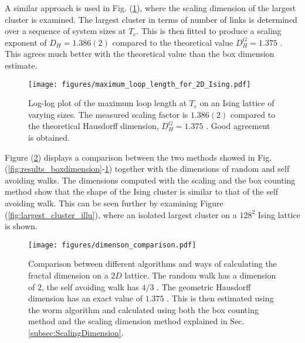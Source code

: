 \newpage

A similar approach is used in Fig. (\ref{fig:results_maxloopdimension}), where the scaling dimension of the largest cluster is examined. The largest cluster in terms of number of links is determined over a sequence of system sizes at $T_c$. This is then fitted to produce a scaling exponent of $D_H = 1.386(2)$ compared to the theoretical value $D_H^G = 1.375$ \cite{Duplantier:GeoHausdorff}. This agrees much better with the theoretical value than the box dimension estimate. 

\begin{figure}[h!]
    \centering
        \texttt{[image: figures/maximum\_loop\_length\_for\_2D\_Ising.pdf]}
    \caption{Log-log plot of the maximum loop length at $T_c$ on an Ising lattice of varying sizes. The measured scaling factor is $1.386(2)$ compared to the theoretical Hausdorff dimension, $D_H^G = 1.375$ \cite{Duplantier:GeoHausdorff}. Good agreement is obtained.}
    \label{fig:results_maxloopdimension}
\end{figure}



Figure (\ref{fig:comparsion_2d_lattice_dimensions}) displays a comparison between the two methods showed in Fig. (\ref{fig:results_boxdimension}-\ref{fig:results_maxloopdimension}) together with the dimensions of random and self avoiding walks. The dimensions computed with the scaling and the box counting method show that the shape of the Ising cluster is similar to that of the self avoiding walk. This can be seen further by examining Figure (\ref{fig:largest_cluster_illu}), where an isolated largest cluster on a $128^2$ Ising lattice is shown.

\begin{figure}[h!]
    \centering
        \texttt{[image: figures/dimenson\_comparison.pdf]}
    \caption{Comparison between different algorithms and ways of calculating the fractal dimension on a $2D$ lattice. The random walk has a dimension of $2$, the self avoiding walk has $4/3$ \cite{Vilgis:FlorySAW}. The geometric Hausdorff dimension has an exact value of $1.375$ \cite{Duplantier:GeoHausdorff}. This is then estimated using the worm algorithm and calculated using both the box counting method and the scaling dimension method explained in Sec. \ref{subsec:ScalingDimension}.}
    \label{fig:comparsion_2d_lattice_dimensions}
\end{figure}

\newpage

